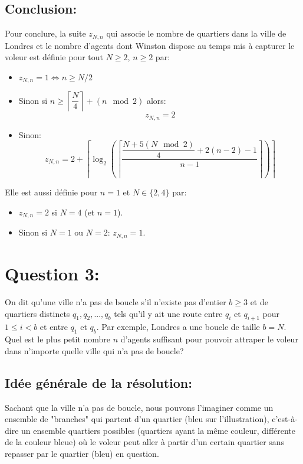 \subsection{Conclusion:}
Pour conclure, la suite $z_{N,n}$ qui associe le nombre de quartiers dans la ville de Londres et le nombre d'agents dont Winston dispose au temps mis à capturer le voleur est définie pour tout $N\geq 2$, $n\geq 2$ par:
\begin{itemize}
    \item $z_{N,n}=1\iff n\geq N/2$
    \item Sinon si $n\geq \left\lceil \dfrac{N}{4}\right\rceil+\left(n\mod 2\right)$ alors: $$z_{N,n}=2$$
    \item Sinon:
    $$z_{N,n}=2+\left\lceil{\log_2\left(\left\lceil{\dfrac{\dfrac{N+5(N\mod 2)}{4}+2(n-2)-1}{n-1}}\right\rceil\right)}\right\rceil$$
\end{itemize}
Elle est aussi définie pour $n=1$ et $N\in\{2,4\}$ par:
\begin{itemize}
    \item $z_{N,n}=2$ si $N=4$ (et $n=1$).
    \item Sinon si $N=1$ ou $N=2$: $z_{N,n}=1$.
\end{itemize}
\section{Question 3:}
\begin{enonce}
On dit qu'une ville n'a pas de boucle s'il n'existe pas d'entier $b\geq 3$ et de quartiers distincts $q_1,q_2,...,q_b$ tels qu'il y ait une route entre $q_i$ et $q_{i+1}$ pour $1\leq i < b$ et entre $q_1$ et $q_b$. Par exemple, Londres a une boucle de taille $b=N$. Quel est le plus petit nombre $n$ d'agents suffisant pour pouvoir attraper le voleur dans n'importe quelle ville qui n'a pas de boucle?
\end{enonce}
\subsection{Idée générale de la résolution:}
Sachant que la ville n'a pas de boucle, nous pouvons l'imaginer comme un ensemble de "branches" qui partent d'un quartier (bleu sur l'illustration), c'est-à-dire un ensemble quartiers possibles (quartiers ayant la même couleur, différente de la couleur bleue) où le voleur peut aller à partir d'un certain quartier sans repasser par le quartier (bleu) en question.

